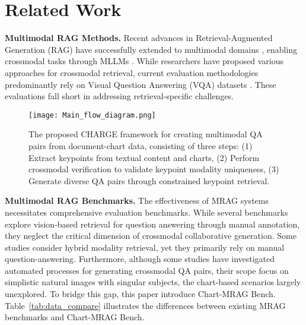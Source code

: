 \section{Related Work}
\noindent \textbf{Multimodal RAG Methods.} Recent advances in Retrieval-Augmented Generation (RAG) \cite{izacard2022few,zhang2024raft} have successfully extended to multimodal domains \cite{chen2022murag,zhao2023retrieving,zhao2024retrieval}, enabling crossmodal tasks through MLLMs \cite{yao2024minicpm, sailvl}. While researchers have proposed various approaches \cite{ma-etal-2024-unifying,faysse2024colpali,yu2024visrag,Methani_2020_WACV,mathew2021docvqa} for crossmodal retrieval, current evaluation methodologies predominantly rely on Visual Question Answering (VQA) datasets \cite{marino2019ok,talmor2021multimodalqa,schwenk2022okvqa,masry2022chartqa}. These evaluations fall short in addressing retrieval-specific challenges.

\begin{figure*}[th]
  \texttt{[image: Main\_flow\_diagram.png]}
  \caption{The proposed CHARGE framework for creating multimodal QA pairs from document-chart data, consisting of three steps: (1) Extract keypoints from textual content and charts, (2) Perform crossmodal verification to validate keypoint modality uniqueness, (3) Generate diverse QA pairs through constrained keypoint retrieval.}
  \label{Main_flow_diagram}
\end{figure*}

\noindent \textbf{Multimodal RAG Benchmarks.} The effectiveness of MRAG systems necessitates comprehensive evaluation benchmarks. While several benchmarks \cite{hu2024mragbench,li2024benchmarking,zhou2024megapairs} explore vision-based retrieval for question answering through manual annotation, they neglect the critical dimension of crossmodal collaborative generation. Some studies \cite{dong2025mmdocir,ma2024mmlongbench,ding2024mvqa} consider hybrid modality retrieval, yet they primarily rely on manual question-answering. Furthermore, although some studies \cite{es2023ragas,abaskohi2024fm2ds,mathew2021docvqa,li2024multimodal,wu2024synthetic} have investigated automated processes for generating crossmodal QA pairs, their scope focus on simplistic natural images with singular subjects, the chart-based scenarios largely unexplored. To bridge this gap, this paper introduce Chart-MRAG Bench. Table~\ref{tab:data_compare} illustrates the differences between existing MRAG benchmarks and Chart-MRAG Bench.